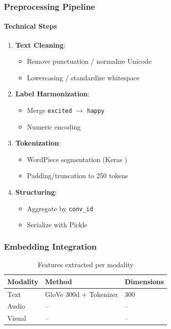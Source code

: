 \documentclass[a4paper,11pt]{article}
\begin{document}
\subsubsection{Preprocessing Pipeline}

\paragraph{Technical Steps}
\begin{enumerate}
  \item \textbf{Text Cleaning}:
    \begin{itemize}
      \item Remove punctuation / normalize Unicode
      \item Lowercasing / standardize whitespace
    \end{itemize}
  \item \textbf{Label Harmonization}:
    \begin{itemize}
      \item Merge \texttt{excited} $\rightarrow$ \texttt{happy}
      \item Numeric encoding
    \end{itemize}
  \item \textbf{Tokenization}:
    \begin{itemize}
      \item WordPiece segmentation (Keras \cite{chollet2015keras})
      \item Padding/truncation to 250 tokens
    \end{itemize}
  \item \textbf{Structuring}:
    \begin{itemize}
      \item Aggregate by \texttt{conv\_id}
      \item Serialize with Pickle
    \end{itemize}
\end{enumerate}

\subsubsection{Embedding Integration}

\begin{table}[h]
  \centering
  \begin{tabular}{lll}
    \toprule
    Modality & Method & Dimensions \\
    \midrule
    Text & GloVe 300d + Tokenizer & 300 \\
    Audio & – & – \\
    Visual & – & – \\
    \bottomrule
  \end{tabular}
  \caption{Features extracted per modality}
  \label{tab:feat_extr}
\end{table}
\end{document}
